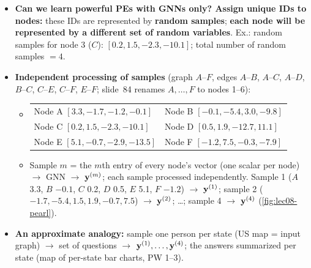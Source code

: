 \begin{itemize}
  \item \textbf{Can we learn powerful PEs with GNNs only? Assign unique IDs to
    nodes:} these IDs are represented by \textbf{random samples}; \textbf{each node
    will be represented by a different set of random variables}. Ex.: random
    samples for node 3 ($C$): $[0.2, 1.5, -2.3, -10.1]$; total number of random
    samples $=4$.
  \item \textbf{Independent processing of samples} (graph $A$--$F$, edges
    $A$--$B$, $A$--$C$, $A$--$D$, $B$--$C$, $C$--$E$, $C$--$F$, $E$--$F$; slide~84
    renames $A,\dots,F$ to nodes 1--6):
    \begin{itemize}
      \item[] \begin{tabular}{@{}ll@{}}
        Node A $[3.3, -1.7, -1.2, -0.1]$ & Node B $[-0.1, -5.4, 3.0, -9.8]$\\
        Node C $[0.2, 1.5, -2.3, -10.1]$ & Node D $[0.5, 1.9, -12.7, 11.1]$\\
        Node E $[5.1, -0.7, -2.9, -13.5]$ & Node F $[-1.2, 7.5, -0.3, -7.9]$
      \end{tabular}
      \item Sample $m$ = the $m$th entry of every node's vector (one scalar per
        node) $\to$ GNN $\to$ $\mathbf{y}^{(m)}$; each sample processed independently.
        Sample 1 ($A$ 3.3, $B$ $-0.1$, $C$ 0.2, $D$ 0.5, $E$ 5.1, $F$ $-1.2$) $\to$
        $\mathbf{y}^{(1)}$; sample 2 ($-1.7, -5.4, 1.5, 1.9, -0.7, 7.5$) $\to$
        $\mathbf{y}^{(2)}$; \dots; sample 4 $\to$ $\mathbf{y}^{(4)}$ (\cref{fig:lec08-pearl}).
    \end{itemize}
  \item \textbf{An approximate analogy:} sample one person per state (US map =
    input graph) $\to$ set of questions $\to$ $\mathbf{y}^{(1)},\dots,\mathbf{y}^{(4)}$; the
    answers summarized per state (map of per-state bar charts, PW 1--3).
\end{itemize}

